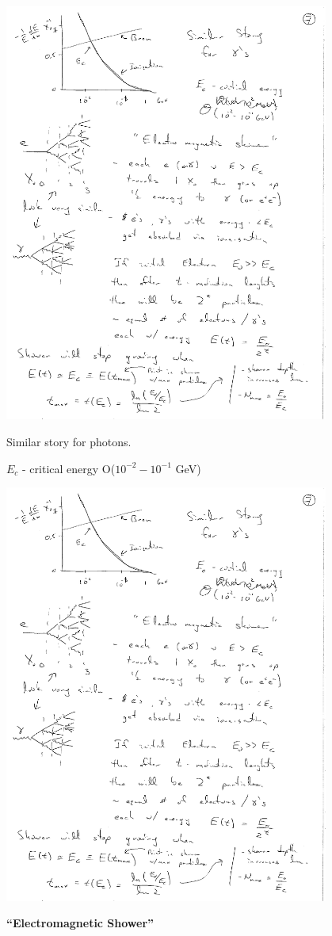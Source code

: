 {\bc
\includegraphics[width=0.8\textwidth]{./DeDxRadiation.pdf}
\ec

Similar story for photons. 

$E_c$ - critical energy O($10^{-2} - 10^{-1}$ GeV)

\begin{minipage}{0.5\textwidth}
\bc
\includegraphics[width=0.8\textwidth]{./EMShower.pdf}
\ec
\end{minipage}\hfill
\begin{minipage}{0.5\textwidth}
\bc
\textbf{``Electromagnetic Shower''}
\ec


\end{minipage}}
